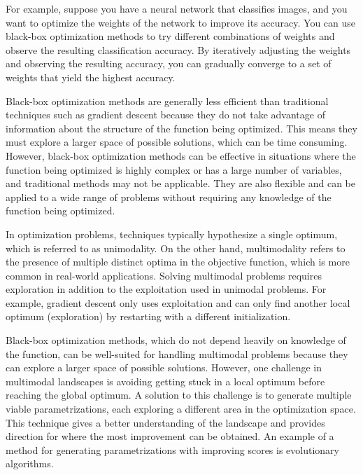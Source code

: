 For example, suppose you have a neural network that classifies images, and you want to optimize the weights of the network to improve its accuracy. You can use black-box optimization methods to try different combinations of weights and observe the resulting classification accuracy. By iteratively adjusting the weights and observing the resulting accuracy, you can gradually converge to a set of weights that yield the highest accuracy. 

Black-box optimization methods are generally less efficient than traditional techniques such as gradient descent because they do not take advantage of information about the structure of the function being optimized. This means they must explore a larger space of possible solutions, which can be time consuming. However, black-box optimization methods can be effective in situations where the function being optimized is highly complex or has a large number of variables, and traditional methods may not be applicable. They are also flexible and can be applied to a wide range of problems without requiring any knowledge of the function being optimized.

In optimization problems, techniques typically hypothesize a single optimum, which is referred to as unimodality. On the other hand, multimodality refers to the presence of multiple distinct optima in the objective function, which is more common in real-world applications. Solving multimodal problems requires exploration in addition to the exploitation used in unimodal problems. For example, gradient descent only uses exploitation and can only find another local optimum (exploration) by restarting with a different initialization.

Black-box optimization methods, which do not depend heavily on knowledge of the function, can be well-suited for handling multimodal problems because they can explore a larger space of possible solutions. However, one challenge in multimodal landscapes is avoiding getting stuck in a local optimum before reaching the global optimum. A solution to this challenge is to generate multiple viable parametrizations, each exploring a different area in the optimization space. This technique gives a better understanding of the landscape and provides direction for where the most improvement can be obtained. An example of a method for generating parametrizations with improving scores is evolutionary algorithms.

